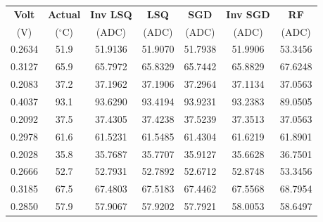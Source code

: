 \begin{tabular}{|c|c|c|c|c|c|c|}
\hline
\textbf{Volt} & \textbf{Actual} & \textbf{Inv LSQ} & \textbf{LSQ} & \textbf{SGD} & \textbf{Inv SGD} & \textbf{RF} \\
(V) & ($^\circ$C) & (ADC) & (ADC) & (ADC) & (ADC) & (ADC) \\
\hline
0.2634 & 51.9 & 51.9136 & 51.9070 & 51.7938 & 51.9906 & 53.3456 \\
0.3127 & 65.9 & 65.7972 & 65.8329 & 65.7442 & 65.8829 & 67.6248 \\
0.2083 & 37.2 & 37.1962 & 37.1906 & 37.2964 & 37.1134 & 37.0563 \\
0.4037 & 93.1 & 93.6290 & 93.4194 & 93.9231 & 93.2383 & 89.0505 \\
0.2092 & 37.5 & 37.4305 & 37.4238 & 37.5239 & 37.3513 & 37.0563 \\
0.2978 & 61.6 & 61.5231 & 61.5485 & 61.4304 & 61.6219 & 61.8901 \\
0.2028 & 35.8 & 35.7687 & 35.7707 & 35.9127 & 35.6628 & 36.7501 \\
0.2666 & 52.7 & 52.7931 & 52.7892 & 52.6712 & 52.8748 & 53.3456 \\
0.3185 & 67.5 & 67.4803 & 67.5183 & 67.4462 & 67.5568 & 68.7954 \\
0.2850 & 57.9 & 57.9067 & 57.9202 & 57.7921 & 58.0053 & 58.6497 \\
\hline
\end{tabular}
